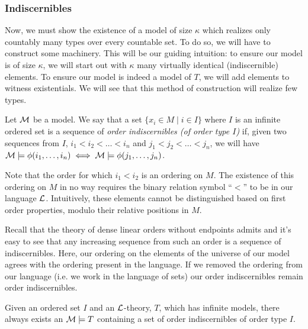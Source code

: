 \subsubsection{Indiscernibles}
Now, we must show the existence of a model of size \(\kappa\) which realizes only countably many types over every countable set. 
To do so, we will have to construct some machinery.
This will be our guiding intuition: to ensure our model is of size \(\kappa\), we will start out with \(\kappa\) many virtually identical (indiscernible) elements. 
To ensure our model is indeed a model of \(T\), we will add elements to witness existentials. 
We will see that this method of construction will realize few types.

\begin{definition}\label{definition_order_indiscernibles}
Let \(\mathcal{M}\) be a model.
We say that a set \(\{x_i \in M \mid i \in I\}\) where \(I\) is an infinite ordered set is a sequence of \textit{order indiscernibles (of order type \(I\))} if, given two sequences from \(I\), 
\(i_1 < i_2 < \ldots < i_n\) and \(j_1 < j_2 < \ldots < j_n\), we will have \(\mathcal{M} \models \phi(i_1, \ldots, i_n) \iff \mathcal{M} \models \phi(j_1, \ldots, j_n)\).  
\end{definition}

Note that the order for which \(i_1 < i_2\) is an ordering on \(M\).
The existence of this ordering on \(M\) in no way requires the binary relation symbol ``\(<\)'' to be in our language \(\mathcal{L}\). 
Intuitively, these elements cannot be distinguished based on first order properties, modulo their relative positions in \(M\). 

Recall that the theory of dense linear orders without endpoints admits \qe \cite{mar} and it's easy to see that any increasing sequence from such an order is a sequence of indiscernibles. 
Here, our ordering on the elements of the universe of our model agrees with the ordering present in the language. 
If we removed the ordering from our language (i.e. we work in the language of sets) our order indiscernibles remain order indiscernibles. 

\begin{theorem}\label{theorem_order_indiscernibles}
Given an ordered set \(I\) and an \(\mathcal{L}\)-theory, \(T\), which has infinite models, there always exists an \(\mathcal{M} \models T\) containing a set of order indiscernibles of order type \(I\). 
\end{theorem}

